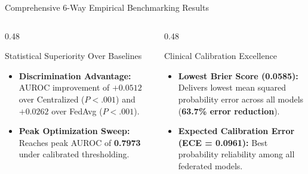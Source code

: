 \documentclass[aspectratio=169, 10pt]{beamer}
\begin{document}
\begin{frame}{Comprehensive 6-Way Empirical Benchmarking Results}
    \begin{columns}[t]
        \begin{column}{0.48\textwidth}
            \begin{block}{Statistical Superiority Over Baselines}
                \scriptsize
                \begin{itemize}
                    \item \textbf{Discrimination Advantage:} AUROC improvement of $+0.0512$ over Centralized ($P < .001$) and $+0.0262$ over FedAvg ($P < .001$).
                    \item \textbf{Peak Optimization Sweep:} Reaches peak AUROC of \textbf{0.7973} under calibrated thresholding.
                \end{itemize}
            \end{block}
        \end{column}
        \begin{column}{0.48\textwidth}
            \begin{alertblock}{Clinical Calibration Excellence}
                \scriptsize
                \begin{itemize}
                    \item \textbf{Lowest Brier Score (0.0585):} Delivers lowest mean squared probability error across all models (\textbf{63.7\% error reduction}).
                    \item \textbf{Expected Calibration Error (ECE = 0.0961):} Best probability reliability among all federated models.
                \end{itemize}
            \end{alertblock}
        \end{column}
    \end{columns}
\end{frame}
\end{document}
